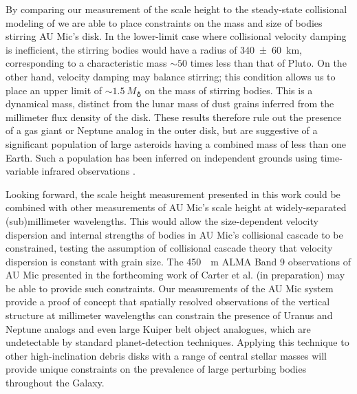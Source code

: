 \documentclass[modern]{aastex62}
\begin{document}
By comparing our measurement of the scale height to the steady-state collisional modeling of \citet{pan&schlichting12} we are able to place constraints on the mass and size of bodies stirring AU Mic's disk.
In the lower-limit case where collisional velocity damping is inefficient, the stirring bodies would have a radius of \SI{340 \pm 60}{km}, corresponding to a characteristic mass $\sim 50$ times less than that of Pluto.
On the other hand, velocity damping may balance stirring; this condition allows us to place an upper limit of $\sim \SI{1.5}{M_\earth}$ on the mass of stirring bodies.
This is a dynamical mass, distinct from the lunar mass of dust grains inferred from the millimeter flux density of the disk.
These results therefore rule out the presence of a gas giant or Neptune analog in the outer disk, but are suggestive of a significant 
population of large asteroids 
having a combined mass of less than one Earth. Such a population has been inferred on independent
grounds using time-variable infrared observations \citep{chiang&fung17}.

Looking forward, the scale height measurement presented in this work could be combined with other measurements of AU Mic's scale height at widely-separated (sub)millimeter wavelengths.
This would allow the size-dependent velocity dispersion and internal strengths of bodies in AU Mic's collisional cascade to be constrained, testing the assumption of collisional cascade theory that velocity dispersion is constant with grain size.
The \SI{450}{\mu m} ALMA Band 9 observations of AU Mic presented in the forthcoming work of Carter et al. (in preparation) may be able to provide such constraints.
Our measurements of the AU Mic system provide a proof of concept that spatially resolved observations of the vertical structure at millimeter wavelengths can constrain the presence of Uranus and Neptune analogs and even large Kuiper belt object analogues, which are undetectable by standard planet-detection techniques.  
Applying this technique to other high-inclination debris disks with a range of central stellar masses will provide unique constraints on the prevalence of 
large perturbing bodies
throughout the Galaxy.
\end{document}
